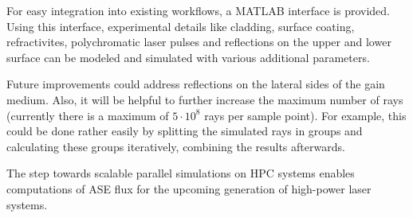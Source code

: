 For easy integration into existing workflows, a MATLAB interface is
provided.  Using this interface, experimental details like cladding,
surface coating, refractivites, polychromatic laser pulses and
reflections on the upper and lower surface can be modeled and simulated
with various additional parameters.

Future improvements could address reflections on the lateral sides of
the gain medium. Also, it will be helpful to further increase the
maximum number of rays (currently there is a maximum of $5\cdot10^8$
rays per sample point). For example, this could be done rather easily
by splitting the simulated rays in groups and calculating these groups
iteratively, combining the results afterwards.

The step towards scalable parallel simulations on HPC systems enables
computations of ASE flux for the upcoming generation of high-power
laser systems.





